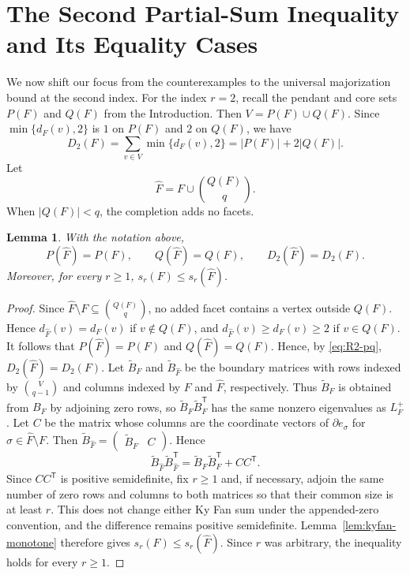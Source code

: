 \documentclass[11pt]{article}
\newtheorem{lemma}[theorem]{Lemma}
\newcommand{\bd}{\partial}
\begin{document}
	\section{The Second Partial-Sum Inequality and Its Equality Cases}
	\label{sec:core-inequality}
	We now shift our focus from the counterexamples to the universal majorization bound at the second index.
	For the index \(r=2\), recall the pendant and core sets \(P(F)\) and
	\(Q(F)\) from the Introduction.
	Then  \(V=P(F)\cup Q(F)\). Since \(\min\{d_F(v),2\}\) is \(1\) on \(P(F)\) and \(2\) on \(Q(F)\), we have
	\begin{equation}\label{eq:R2-pq}
		D_2(F)
		=
		\sum_{v\in V}\min\{d_F(v),2\}
		=
		|P(F)|+2|Q(F)|.
	\end{equation}
Let
	\[
		\widehat F=F\cup\binom{Q(F)}q.
	\]
	When \(|Q(F)|<q\), the completion adds no facets.
	
	\begin{lemma}\label{lem:completion}
		With the notation above,
		\[
		P(\widehat F)=P(F),
		\qquad
		Q(\widehat F)=Q(F),
		\qquad
		D_2(\widehat F)=D_2(F).
		\]
		Moreover, for every \(r\ge1\),
		\(s_r(F)\le s_r(\widehat F)\).
	\end{lemma}
	
	\begin{proof}
		Since \(\widehat F\setminus F\subseteq\binom{Q(F)}q\), no added facet contains a
		vertex outside \(Q(F)\). Hence
		\(d_{\widehat F}(v)=d_F(v)\) if \(v\notin Q(F)\), and
		\(d_{\widehat F}(v)\ge d_F(v)\ge2\) if \(v\in Q(F)\).
		It follows that \(P(\widehat F)=P(F)\) and
		\(Q(\widehat F)=Q(F)\).
		Hence, by \eqref{eq:R2-pq},
		\(D_2(\widehat F)=D_2(F)\).
		Let \(\widetilde B_F\) and \(\widetilde B_{\widehat F}\) be the boundary
		matrices with rows indexed by \(\binom V{q-1}\) and columns indexed by
		\(F\) and \(\widehat F\), respectively.  Thus \(\widetilde B_F\)
		is obtained from \(B_F\) by adjoining zero rows, so
		\(\widetilde B_F\widetilde B_F^{\mathsf T}\) has the same nonzero
		eigenvalues as \(L_F^+\). Let \(C\) be the
		matrix whose columns are the coordinate vectors of \(\bd e_{\sigma}\)
		for \(\sigma\in\widehat F\setminus F\). Then
		\(\widetilde B_{\widehat F}
		=\begin{pmatrix}\widetilde B_F&C\end{pmatrix}\). Hence
		\[
		\widetilde B_{\widehat F}\widetilde B_{\widehat F}^{\mathsf T}
		=
		\widetilde B_F\widetilde B_F^{\mathsf T}
		+
		CC^{\mathsf T}.
		\]
		Since \(CC^{\mathsf T}\) is positive
		semidefinite, fix \(r\ge1\)
		and, if necessary, adjoin the same number of zero rows and columns to
		both matrices so that their common size is at least \(r\).  This does
		not change either Ky Fan sum under the appended-zero convention, and
		the difference remains positive semidefinite.  Lemma~\ref{lem:kyfan-monotone}
		therefore gives \(s_r(F)\le s_r(\widehat F)\).  Since \(r\) was arbitrary,
		the inequality holds for every \(r\ge1\).
	\end{proof}
	
\end{document}
